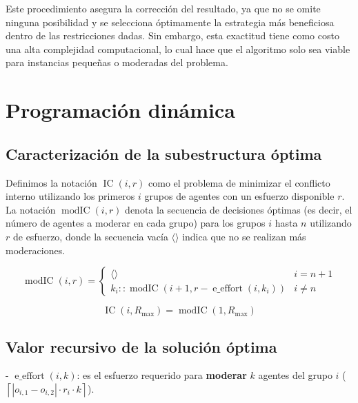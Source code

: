 Este procedimiento asegura la corrección del resultado, ya que no se omite ninguna posibilidad y se selecciona óptimamente la estrategia más beneficiosa dentro de las restricciones dadas. Sin embargo, esta exactitud tiene como costo una alta complejidad computacional, lo cual hace que el algoritmo solo sea viable para instancias pequeñas o moderadas del problema.

\section{Programación dinámica}

\subsection{Caracterización de la subestructura óptima}

Definimos la notación $\operatorname{ IC }(i,r)$ como el problema de minimizar el conflicto interno utilizando los primeros $i$ grupos de agentes con un esfuerzo disponible $r$. La notación $\operatorname{ modIC }(i,r)$ denota la secuencia de decisiones óptimas (es decir, el número de agentes a moderar en cada grupo) para los grupos $i$ hasta $n$ utilizando $r$ de esfuerzo, donde la secuencia vacía $\langle \rangle$ indica que no se realizan más moderaciones.

\begin{equation}
	\operatorname{ modIC }(i,r) = \begin{cases}
		\langle \rangle                                                             & i = n + 1 \\
		k_i :: \operatorname{ modIC }(i + 1,r - \operatorname{ e\_effort }(i,k_i))  & i \neq n
	\end{cases}
\end{equation}

\begin{equation}
	\operatorname{ IC }(i,R_{ \max }) = \operatorname{ modIC }(1,R_{ \max })
\end{equation}

\subsection{Valor recursivo de la solución óptima}

- $\operatorname{ e\_effort }(i,k)$: es el esfuerzo requerido para \textbf{moderar} $k$ agentes del grupo $i$ ($\left \lceil |o_{ i,1 } - o_{ i,2 }| \cdot r_i \cdot k \right \rceil$).

